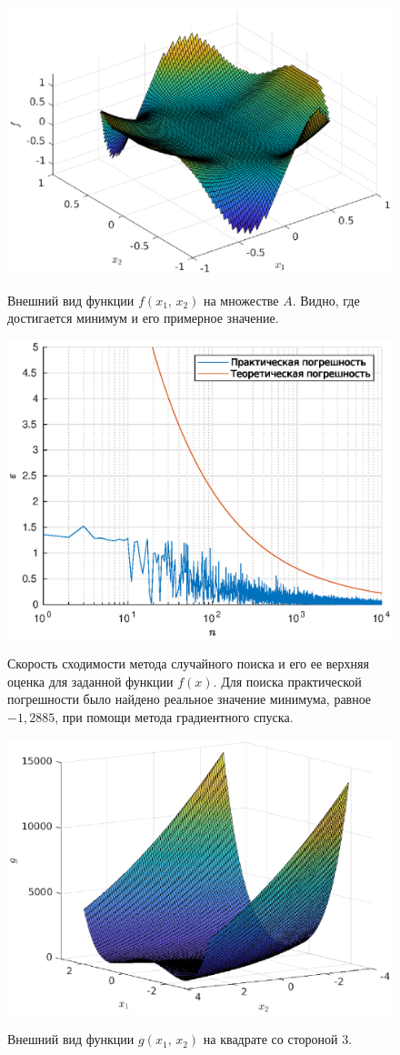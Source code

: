 \begin{figure}[t]
        \noindent
        \centering
        {
                \includegraphics[width=120mm]{task_07/f_func.eps}
        }
        \caption{Внешний вид функции $f(x_1,\,x_2)$ на множестве $A$. Видно, где достигается минимум и его примерное значение.}
\end{figure}
\begin{figure}[t]
        \noindent
        \centering
        {
                \includegraphics[width=120mm]{task_07/speed.eps}
        }
        \caption{Скорость сходимости метода случайного поиска и его ее верхняя оценка для заданной функции $f(x)$. Для поиска практической погрешности было найдено реальное значение минимума, равное $-1,\!2885$, при помощи метода градиентного спуска.}
\end{figure}
\begin{figure}[b]
       \noindent
        \centering
        {
                \includegraphics[width=120mm]{task_07/g_func.eps}
        }
        \caption{Внешний вид функции $g(x_1,\,x_2)$ на квадрате со стороной 3.}
\end{figure}